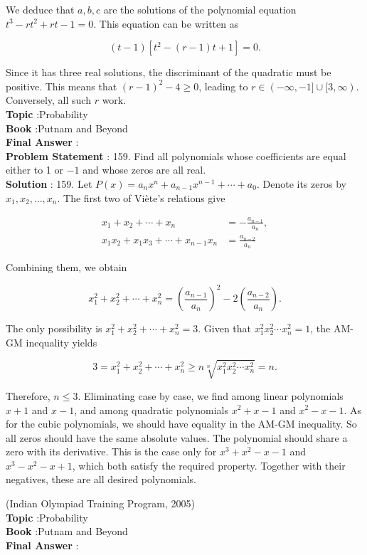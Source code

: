 \documentclass[10pt]{article}
\begin{document}
We deduce that $a, b, c$ are the solutions of the polynomial equation $t^{3}-r t^{2}+r t-1=0$. This equation can be written as

$$
(t-1)\left[t^{2}-(r-1) t+1\right]=0 .
$$

Since it has three real solutions, the discriminant of the quadratic must be positive. This means that $(r-1)^{2}-4 \geq 0$, leading to $r \in(-\infty,-1] \cup[3, \infty)$. Conversely, all such $r$ work.
\\
\textbf{Topic} :Probability\\
\textbf{Book} :Putnam and Beyond\\
\textbf{Final Answer} :\\


\textbf{Problem Statement} :
159. Find all polynomials whose coefficients are equal either to 1 or $-1$ and whose zeros are all real.
\\
\textbf{Solution} :
159. Let $P(x)=a_{n} x^{n}+a_{n-1} x^{n-1}+\cdots+a_{0}$. Denote its zeros by $x_{1}, x_{2}, \ldots, x_{n}$. The first two of Viète's relations give

$$
\begin{aligned}
x_{1}+x_{2}+\cdots+x_{n} &=-\frac{a_{n-1}}{a_{n}}, \\
x_{1} x_{2}+x_{1} x_{3}+\cdots+x_{n-1} x_{n} &=\frac{a_{n-2}}{a_{n}}
\end{aligned}
$$

Combining them, we obtain

$$
x_{1}^{2}+x_{2}^{2}+\cdots+x_{n}^{2}=\left(\frac{a_{n-1}}{a_{n}}\right)^{2}-2\left(\frac{a_{n-2}}{a_{n}}\right) .
$$

The only possibility is $x_{1}^{2}+x_{2}^{2}+\cdots+x_{n}^{2}=3$. Given that $x_{1}^{2} x_{2}^{2} \cdots x_{n}^{2}=1$, the AM-GM inequality yields 

$$
3=x_{1}^{2}+x_{2}^{2}+\cdots+x_{n}^{2} \geq n \sqrt[n]{x_{1}^{2} x_{2}^{2} \cdots x_{n}^{2}}=n .
$$

Therefore, $n \leq 3$. Eliminating case by case, we find among linear polynomials $x+1$ and $x-1$, and among quadratic polynomials $x^{2}+x-1$ and $x^{2}-x-1$. As for the cubic polynomials, we should have equality in the AM-GM inequality. So all zeros should have the same absolute values. The polynomial should share a zero with its derivative. This is the case only for $x^{3}+x^{2}-x-1$ and $x^{3}-x^{2}-x+1$, which both satisfy the required property. Together with their negatives, these are all desired polynomials.

(Indian Olympiad Training Program, 2005)
\\
\textbf{Topic} :Probability\\
\textbf{Book} :Putnam and Beyond\\
\textbf{Final Answer} :\\
\end{document}
